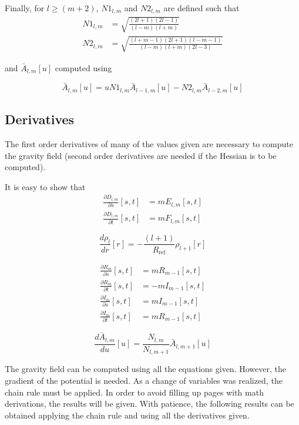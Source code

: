 \documentclass[]{AVSSimReportMemo}
\begin{document}
Finally, for $l \geq (m+2)$, $N1_{l,m}$ and $N2_{l,m}$ are defined such that
\begin{align}
N1_{l,m} &= \sqrt{\frac{(2 l + 1) (2 l - 1)}{(l - m) (l + m)}}\\
N2_{l,m} &= \sqrt{\frac{(l + m - 1) (2 l + 1) (l - m -1)}{(l - m) (l + m) (2 l - 3)}}
\end{align}

and $\bar A_{l,m}[u]$ computed using

\begin{equation}
\bar A_{l,m}[u] = u N1_{l,m} \bar A_{l-1,m}[u] - N2_{l,m} \bar A_{l-2,m}[u]
\end{equation}


\subsection{Derivatives}

The first order derivatives of many of the values given are necessary to compute the gravity field (second order derivatives are needed if the Hessian is to be computed).

It is easy to show that
\begin{align}
\frac{\partial D_{l,m}}{\partial s}[s,t] &= m E_{l,m}[s,t]\\
\frac{\partial D_{l,m}}{\partial t}[s,t] &= m F_{l,m}[s,t]
\end{align}

\begin{equation}
\frac{d \rho_l}{d r}[r] = -\frac{(l+1)}{R_{\text{ref}}} \rho_{l+1}[r]
\end{equation}

\begin{align}
\frac{\partial R_m}{\partial s}[s,t] &= m R_{m-1}[s,t]\\
\frac{\partial R_m}{\partial t}[s,t] &= -m I_{m-1}[s,t]\\
\frac{\partial I_m}{\partial s}[s,t] &= m I_{m-1}[s,t]\\
\frac{\partial I_m}{\partial t}[s,t] &= m R_{m-1}[s,t]
\end{align}

\begin{equation}
\frac{d \bar A_{l,m}}{d u}[u] = \frac{N_{l,m}}{N_{l,m+1}} \bar A_{l,m+1}[u]
\end{equation}

The gravity field can be computed using all the equations given. However, the gradient of the potential is needed. As a change of variables was realized, the chain rule must be applied. In order to avoid filling up pages with math derivations, the results will be given. With patience, the following results can be obtained applying the chain rule and using all the derivatives given.
\end{document}
